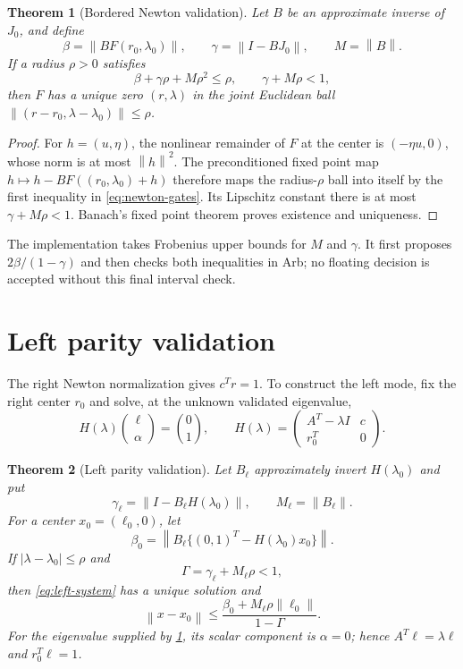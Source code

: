 \documentclass[11pt]{article}
\newtheorem{theorem}{Theorem}[section]
\theoremstyle{definition}
\newcommand{\norm}[1]{\left\lVert#1\right\rVert}
\begin{document}
\begin{theorem}[Bordered Newton validation]
\label{thm:newton}
Let $B$ be an approximate inverse of $J_0$, and define
\[
 \beta=\norm{BF(r_0,\lambda_0)},\qquad
 \gamma=\norm{I-BJ_0},\qquad M=\norm B.
\]
If a radius $\rho>0$ satisfies
\begin{equation}
 \beta+\gamma\rho+M\rho^2\le\rho,
 \qquad \gamma+M\rho<1,
 \label{eq:newton-gates}
\end{equation}
then $F$ has a unique zero $(r,\lambda)$ in the joint Euclidean ball
$\norm{(r-r_0,\lambda-\lambda_0)}\le\rho$.
\end{theorem}

\begin{proof}
For $h=(u,\eta)$, the nonlinear remainder of $F$ at the center is
$(-\eta u,0)$, whose norm is at most $\norm h^2$.  The preconditioned fixed
point map $h\mapsto h-BF((r_0,\lambda_0)+h)$ therefore maps the radius-$\rho$
ball into itself by the first inequality in \eqref{eq:newton-gates}.  Its
Lipschitz constant there is at most $\gamma+M\rho<1$.  Banach's fixed point
theorem proves existence and uniqueness.
\end{proof}

The implementation takes Frobenius upper bounds for $M$ and $\gamma$.  It
first proposes $2\beta/(1-\gamma)$ and then checks both inequalities in Arb;
no floating decision is accepted without this final interval check.

\section{Left parity validation}
\label{sec:left}

The right Newton normalization gives $c^Tr=1$.  To construct the left mode,
fix the right center $r_0$ and solve, at the unknown validated eigenvalue,
\begin{equation}
 H(\lambda)
 \binom{\ell}{\alpha}
 =\binom0{1},
 \qquad
 H(\lambda)=
 \begin{pmatrix}A^T-\lambda I&c\\r_0^T&0\end{pmatrix}.
 \label{eq:left-system}
\end{equation}

\begin{theorem}[Left parity validation]
\label{thm:left}
Let $B_\ell$ approximately invert $H(\lambda_0)$ and put
\[
 \gamma_\ell=\norm{I-B_\ell H(\lambda_0)},
 \qquad M_\ell=\norm{B_\ell}.
\]
For a center $x_0=(\ell_0,0)$, let
\[
 \beta_0=\norm{B_\ell\{(0,1)^T-H(\lambda_0)x_0\}}.
\]
If $|\lambda-\lambda_0|\le\rho$ and
\begin{equation}
 \Gamma=\gamma_\ell+M_\ell\rho<1,
 \label{eq:left-gate}
\end{equation}
then \eqref{eq:left-system} has a unique solution and
\begin{equation}
 \norm{x-x_0}
 \le
 \frac{\beta_0+M_\ell\rho\norm{\ell_0}}{1-\Gamma}.
 \label{eq:left-error}
\end{equation}
For the eigenvalue supplied by \cref{thm:newton}, its scalar component is
$\alpha=0$; hence $A^T\ell=\lambda\ell$ and $r_0^T\ell=1$.
\end{theorem}
\end{document}
